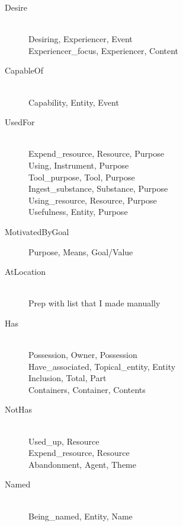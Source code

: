 \begin{description}
\item[Desire] \hfill \\ 
Desiring, Experiencer, Event \hfill \\ 
Experiencer_focus, Experiencer, Content  \hfill \\ 

\item[CapableOf] \hfill \\ 
Capability, Entity, Event \hfill \\ 

\item[UsedFor] \hfill \\ 
Expend_resource, Resource, Purpose \hfill \\ 
Using, Instrument, Purpose \hfill \\ 
Tool_purpose, Tool, Purpose \hfill \\ 
Ingest_substance, Substance, Purpose \hfill \\ 
Using_resource, Resource, Purpose \hfill \\ 
Usefulness, Entity, Purpose \hfill \\ 

\item[MotivatedByGoal]
Purpose, Means, Goal/Value \hfill \\ 

\item[AtLocation] \hfill \\ 
Prep with list that I made manually \hfill \\ 

\item[Has] \hfill \\ 
Possession, Owner, Possession \hfill \\ 
Have_associated, Topical_entity, Entity \hfill \\ 
Inclusion, Total, Part \hfill \\ 
Containers, Container, Contents \hfill \\ 

\item[NotHas] \hfill \\ 
Used_up, Resource \hfill \\ 
Expend_resource, Resource \hfill \\ 
Abandonment, Agent, Theme \hfill \\ 

\item[Named] \hfill \\ 
Being_named, Entity, Name \hfill \\ 


\end{description}
